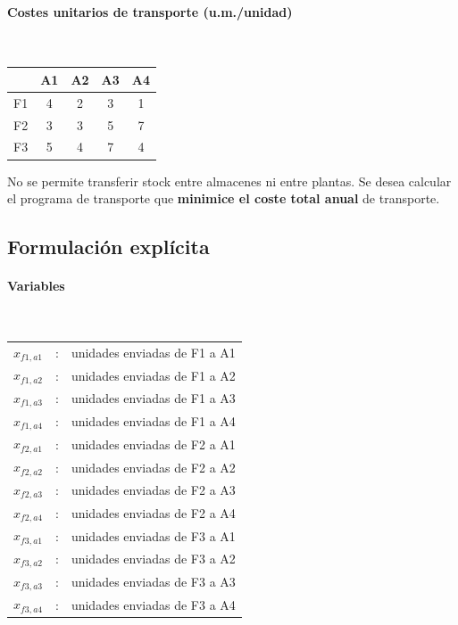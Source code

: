 \vspace{0.6em}
\paragraph{Costes unitarios de transporte (u.m./unidad)}\mbox{}\\
\begin{tabular}{c | c c c c}
\hline
            & A1 & A2 & A3 & A4 \\
\hline
F1          & 4  & 2  & 3  & 1  \\
F2          & 3  & 3  & 5  & 7  \\
F3          & 5  & 4  & 7  & 4  \\
\hline
\end{tabular}

\noindent
No se permite transferir stock entre almacenes ni entre plantas. Se desea calcular el programa de transporte que \textbf{minimice el coste total anual} de transporte.

\subsection{Formulación explícita}

\paragraph{Variables}\mbox{}\\
\begin{tabular}{l c l}
    $x_{f1,a1}$ & : & unidades enviadas de F1 a A1 \\
    $x_{f1,a2}$ & : & unidades enviadas de F1 a A2 \\
    $x_{f1,a3}$ & : & unidades enviadas de F1 a A3 \\
    $x_{f1,a4}$ & : & unidades enviadas de F1 a A4 \\
    $x_{f2,a1}$ & : & unidades enviadas de F2 a A1 \\
    $x_{f2,a2}$ & : & unidades enviadas de F2 a A2 \\
    $x_{f2,a3}$ & : & unidades enviadas de F2 a A3 \\
    $x_{f2,a4}$ & : & unidades enviadas de F2 a A4 \\
    $x_{f3,a1}$ & : & unidades enviadas de F3 a A1 \\
    $x_{f3,a2}$ & : & unidades enviadas de F3 a A2 \\
    $x_{f3,a3}$ & : & unidades enviadas de F3 a A3 \\
    $x_{f3,a4}$ & : & unidades enviadas de F3 a A4 \\
\end{tabular}

